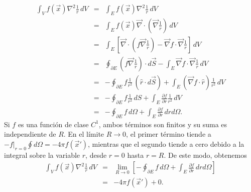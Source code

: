 \begin{eqnarray}
  \int_V f(\vec{x})\nabla^2\frac 1r\, dV &=&
  \int_E f(\vec{x})\nabla^2\frac 1r\, dV \\
&=&\int_E f(\vec
x)\vec\nabla\cdot\left(\vec\nabla\frac {1}{r}\right) \, dV\\
&=&
\int_E\left[\vec\nabla\cdot\left(f\vec\nabla\frac{1}{r}\right)-\vec\nabla
f\cdot \vec\nabla\frac{1}{r}\right]\,
dV\\
&=& \oint_{\partial E}\left(f\vec\nabla\frac{1}{r}\right)\cdot
d\vec{S}
-\int_E \vec\nabla f\cdot \vec\nabla\frac{1}{r}\, dV\\
&=& -\oint_{\partial E}f\frac{1}{r^2}\, (\hat{r}\cdot d\vec{S})
+\int_E (\vec\nabla f\cdot\hat{r})\frac{1}{r^2}\, dV\\
&=& -\oint_{\partial E}f\frac{1}{r^2}\, dS
+\int_E \frac{\partial f}{\partial r}\frac{1}{r^2}\, dV \\
&=& -\oint_{\partial E}f\, d\Omega
+\int_E \frac{\partial f}{\partial r}\, drd\Omega .
\end{eqnarray}
Si $f$ es una función de clase $C^1$, ambos términos son finitos y su suma es
independiente de $R$. En el límite $R\rightarrow 0$, el primer término tiende
a $-f|_{r=0}\oint d\Omega=-4\pi f(\vec x')$, mientras que el segundo tiende a
cero debido a la integral sobre la variable $r$, desde $r=0$ hasta $r=R$. De
este modo, obtenemos
\begin{eqnarray}
  \int_V f(\vec{x})\nabla^2\frac 1r\, dV &=& \lim_{R\rightarrow
0}\left[-\oint_{\partial E}f\, d\Omega+\int_E \frac{\partial f}{\partial r}\,
drd\Omega \right]\\
&=& -4\pi f(\vec x')+0.
\end{eqnarray}
